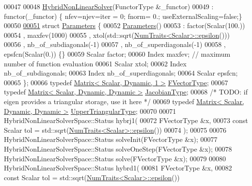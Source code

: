 \begin{DoxyCode}
00047 
00048     \hyperlink{class_eigen_1_1_hybrid_non_linear_solver}{HybridNonLinearSolver}(FunctorType &\_functor)
00049         : functor(\_functor) \{ nfev=njev=iter = 0;  fnorm= 0.; useExternalScaling=\textcolor{keyword}{false};\}
00050 
\hyperlink{struct_eigen_1_1_hybrid_non_linear_solver_1_1_parameters}{00051}     \textcolor{keyword}{struct }\hyperlink{struct_eigen_1_1_hybrid_non_linear_solver_1_1_parameters}{Parameters} \{
00052         \hyperlink{struct_eigen_1_1_hybrid_non_linear_solver_1_1_parameters}{Parameters}()
00053             : factor(Scalar(100.))
00054             , maxfev(1000)
00055             , xtol(std::sqrt(\hyperlink{group___core___module_struct_eigen_1_1_num_traits}{NumTraits<Scalar>::epsilon}()))
00056             , nb\_of\_subdiagonals(-1)
00057             , nb\_of\_superdiagonals(-1)
00058             , epsfcn(Scalar(0.)) \{\}
00059         Scalar factor;
00060         Index maxfev;   \textcolor{comment}{// maximum number of function evaluation}
00061         Scalar xtol;
00062         Index nb\_of\_subdiagonals;
00063         Index nb\_of\_superdiagonals;
00064         Scalar epsfcn;
00065     \};
00066     \textcolor{keyword}{typedef} \hyperlink{group___core___module}{Matrix< Scalar, Dynamic, 1 >} \hyperlink{group___core___module}{FVectorType};
00067     \textcolor{keyword}{typedef} \hyperlink{group___core___module}{Matrix< Scalar, Dynamic, Dynamic >} 
      \hyperlink{group___core___module}{JacobianType};
00068     \textcolor{comment}{/* TODO: if eigen provides a triangular storage, use it here */}
00069     \textcolor{keyword}{typedef} \hyperlink{group___core___module}{Matrix< Scalar, Dynamic, Dynamic >} 
      \hyperlink{group___core___module}{UpperTriangularType};
00070 
00071     HybridNonLinearSolverSpace::Status hybrj1(
00072             FVectorType  &x,
00073             \textcolor{keyword}{const} Scalar tol = std::sqrt(\hyperlink{group___core___module_struct_eigen_1_1_num_traits}{NumTraits<Scalar>::epsilon}())
00074             );
00075 
00076     HybridNonLinearSolverSpace::Status solveInit(FVectorType  &x);
00077     HybridNonLinearSolverSpace::Status solveOneStep(FVectorType  &x);
00078     HybridNonLinearSolverSpace::Status solve(FVectorType  &x);
00079 
00080     HybridNonLinearSolverSpace::Status hybrd1(
00081             FVectorType  &x,
00082             \textcolor{keyword}{const} Scalar tol = std::sqrt(\hyperlink{group___core___module_struct_eigen_1_1_num_traits}{NumTraits<Scalar>::epsilon}())

\end{DoxyCode}

